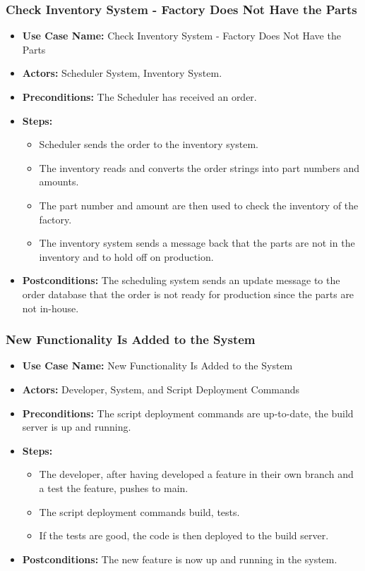 \subsubsection{Check Inventory System - Factory Does Not Have the Parts}
\label{sec:check-inventory-no-parts}

\begin{itemize}
\item \textbf{Use Case Name:} Check Inventory System - Factory Does Not Have the Parts
\item \textbf{Actors:} Scheduler System, Inventory System.
\item \textbf{Preconditions:} The Scheduler has received an order.
\item \textbf{Steps:}
\begin{itemize}[label=--]
\item Scheduler sends the order to the inventory system.
\item The inventory reads and converts the order strings into part numbers and amounts.
\item The part number and amount are then used to check the inventory of the factory.
\item The inventory system sends a message back that the parts are not in the inventory and to hold off on production.
\end{itemize}
\item \textbf{Postconditions:} The scheduling system sends an update message to the order database that the order is not ready for production since the parts are not in-house.
\end{itemize}
\vspace{1em} 

\subsubsection{New Functionality Is Added to the System}
\label{sec:new-functionality-added}

\begin{itemize}
\item \textbf{Use Case Name:} New Functionality Is Added to the System
\item \textbf{Actors:} Developer, System, and Script Deployment Commands
\item \textbf{Preconditions:} The script deployment commands are up-to-date, the build server is up and running.
\item \textbf{Steps:}
\begin{itemize}[label=--]
\item The developer, after having developed a feature in their own branch and a test the feature, pushes to main.
\item The script deployment commands build, tests.
\item If the tests are good, the code is then deployed to the build server.
\end{itemize}
\item \textbf{Postconditions:} The new feature is now up and running in the system.
\end{itemize}

